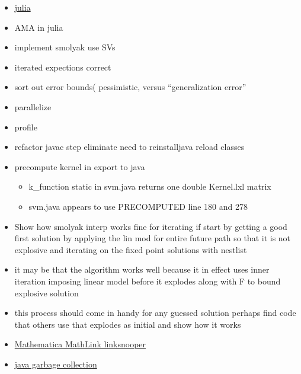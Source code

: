 \documentclass[hyperref]{labbook}
\begin{document}

\begin{itemize}
\item \href{https://github.com/JuliaInterop/Mathematica.jl}{julia}
\item AMA in julia
\end{itemize}




  \begin{itemize}
  \item implement smolyak use SVs
  \item iterated expections correct
  \item sort out error bounds( pessimistic, versus ``generalization error''
  \item parallelize
  \item profile
  \item refactor javac step eliminate need to reinstalljava reload classes
  \item precompute kernel in export to java
    \begin{itemize}
    \item k\_function static in svm.java returns one double Kernel.lxl matrix
    \item svm.java appears to use PRECOMPUTED line 180 and 278 
    \end{itemize}

  \item Show how smolyak interp works fine for iterating if start by getting
    a good first solution by applying the lin mod for entire future path so that it is not explosive and iterating on the fixed point solutions  with nestlist
    
  \item it may be that the algorithm works well because it in effect uses inner  iteration imposing linear model before it explodes along with F to bound explosive solution 
  \item this process should come in handy for any guessed solution perhaps
    find code that others use that explodes as initial and show how it works
  \end{itemize}
  


\begin{itemize}
\item \href{http://reference.wolfram.com/language/JLink/ref/java/com/wolfram/jlink/util/LinkSnooper.html}{Mathematica MathLink linksnooper}
\item \href{http://www.oracle.com/technetwork/java/javase/memorymanagement-whitepaper-150215.pdf}{java garbage collection}
\end{itemize}
\end{document}
